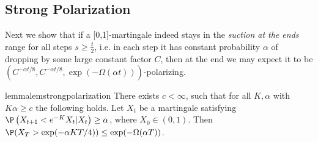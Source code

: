 \documentclass[11pt]{article}
\begin{document}
\subsection{Strong Polarization}\label{ssec:local-to-strong-global}

Next we show that if a [0,1]-martingale indeed stays in the \emph{suction at the ends} range for all steps $s\geq \frac{t}{2}$, i.e. in each step it has constant probability $\alpha$ of dropping by some large constant factor $C$, then at the end we may expect it to be $\left(C^{-\alpha t / 8}, C^{-\alpha t / 8}, \exp(-\Omega(\alpha t))\right)$-polarizing.

\begin{restatable}{lemma}{lemstrongpolarization}
	There exists $c < \infty$, such that for all $K, \alpha$ with $K \alpha \geq c$ the following holds.
	Let $X_t$ be a martingale satisfying $\P\left(X_{t+1} < e^{-K} X_t | X_t\right) \geq \alpha$, where $X_0 \in (0, 1)$. Then $\P(X_T > \exp(- \alpha K T/4)) \leq \exp(-\Omega(\alpha T))$.
	\label{lem:strong-polarization}
\end{restatable}
\end{document}
